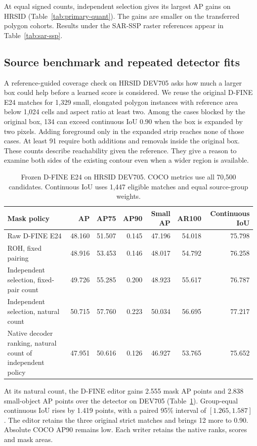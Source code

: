 \documentclass[journal]{IEEEtran}
\begin{document}
At equal signed counts, independent selection gives its largest AP gains on HRSID (Table~\ref{tab:primary-quant}). The gains are smaller on the transferred polygon cohorts. Results under the SAR-SSP raster references appear in Table~\ref{tab:sar-ssp}.

\subsection{Source benchmark and repeated detector fits}

A reference-guided coverage check on HRSID DEV705 asks how much a larger box could help before a learned score is considered. We reuse the original D-FINE E24 matches for 1,329 small, elongated polygon instances with reference area below 1,024 cells and aspect ratio at least two. Among the cases blocked by the original box, 134 can exceed continuous IoU 0.90 when the box is expanded by two pixels. Adding foreground only in the expanded strip reaches none of those cases. At least 91 require both additions and removals inside the original box. These counts describe reachability given the reference. They give a reason to examine both sides of the existing contour even when a wider region is available.
\begin{table}[t]
\centering
\caption{Frozen D-FINE E24 on HRSID DEV705. COCO metrics use all 70,500 candidates. Continuous IoU uses 1,447 eligible matches and equal source-group weights.}
\label{tab:dev}
\begin{tabular}{lrrrrrr}
\toprule
Mask policy & AP & AP75 & AP90 & Small AP & AR100 & Continuous IoU\\
\midrule
Raw D-FINE E24 & 48.160 & 51.507 & 0.145 & 47.196 & 54.018 & 75.798\\
ROH, fixed pairing & 48.916 & 53.453 & 0.146 & 48.017 & 54.792 & 76.258\\
Independent selection, fixed-pair count & 49.726 & 55.285 & 0.200 & 48.923 & 55.617 & 76.787\\
\midrule
Independent selection, natural count & 50.715 & 57.760 & 0.223 & 50.034 & 56.695 & 77.217\\
Native decoder ranking, natural count of independent policy & 47.951 & 50.616 & 0.126 & 46.927 & 53.765 & 75.652\\
\bottomrule
\end{tabular}
\end{table}

At its natural count, the D-FINE editor gains 2.555 mask AP points and 2.838 small-object AP points over the detector on DEV705 (Table~\ref{tab:dev}). Group-equal continuous IoU rises by 1.419 points, with a paired 95\% interval of \([1.265,1.587]\). The editor retains the three original strict matches and brings 12 more to 0.90. Absolute COCO AP90 remains low. Each writer retains the native ranks, scores and mask areas.
\end{document}
